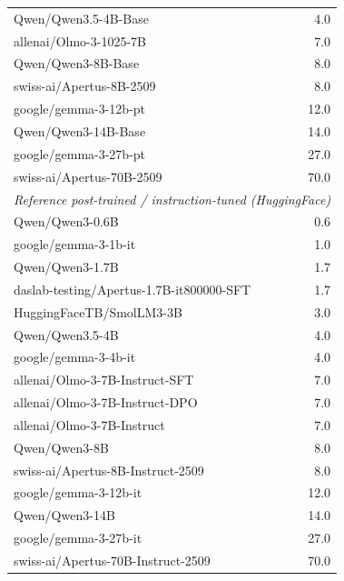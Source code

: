 \begin{table}[t]
\begin{tabular}{lr}
Qwen/Qwen3.5-4B-Base                  & 4.0 \\
allenai/Olmo-3-1025-7B                & 7.0 \\
Qwen/Qwen3-8B-Base                    & 8.0 \\
swiss-ai/Apertus-8B-2509              & 8.0 \\
google/gemma-3-12b-pt                 & 12.0 \\
Qwen/Qwen3-14B-Base                   & 14.0 \\
google/gemma-3-27b-pt                 & 27.0 \\
swiss-ai/Apertus-70B-2509             & 70.0 \\
\midrule
\multicolumn{2}{l}{\emph{Reference post-trained / instruction-tuned (HuggingFace)}} \\
\midrule
Qwen/Qwen3-0.6B                            & 0.6 \\
google/gemma-3-1b-it                       & 1.0 \\
Qwen/Qwen3-1.7B                            & 1.7 \\
daslab-testing/Apertus-1.7B-it800000-SFT   & 1.7 \\
HuggingFaceTB/SmolLM3-3B                   & 3.0 \\
Qwen/Qwen3.5-4B                            & 4.0 \\
google/gemma-3-4b-it                       & 4.0 \\
allenai/Olmo-3-7B-Instruct-SFT             & 7.0 \\
allenai/Olmo-3-7B-Instruct-DPO             & 7.0 \\
allenai/Olmo-3-7B-Instruct                 & 7.0 \\
Qwen/Qwen3-8B                              & 8.0 \\
swiss-ai/Apertus-8B-Instruct-2509          & 8.0 \\
google/gemma-3-12b-it                      & 12.0 \\
Qwen/Qwen3-14B                             & 14.0 \\
google/gemma-3-27b-it                      & 27.0 \\
swiss-ai/Apertus-70B-Instruct-2509         & 70.0 \\
\bottomrule
\end{tabular}
\end{table}
